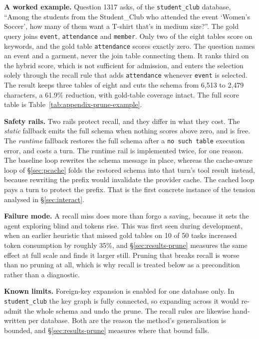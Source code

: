 \documentclass[conference]{IEEEtran}
\begin{document}
\textbf{A worked example.} Question 1317 asks, of the \texttt{student\_club}
database, ``Among the students from the Student\_Club who attended the event
`Women's Soccer', how many of them want a T-shirt that's in medium size?''. The
gold query joins \texttt{event}, \texttt{attendance} and \texttt{member}. Only
two of the eight tables score on keywords, and the gold table
\texttt{attendance} scores exactly zero. The question names an event and a
garment, never the join table connecting them. It ranks third on the hybrid score, which is
not sufficient for admission, and enters the selection solely through the recall
rule that adds \texttt{attendance} whenever \texttt{event} is selected. The
result keeps three tables of eight and cuts the schema from 6{,}513 to 2{,}479
characters, a 61.9\% reduction, with gold-table coverage intact. The full score
table is Table~\ref{tab:appendix-prune-example}.

\textbf{Safety rails.} Two rails protect recall, and they differ in what they
cost. The \emph{static} fallback emits the full schema when nothing scores above
zero, and is free. The \emph{runtime} fallback restores the full schema after a
\texttt{no such table} execution error, and costs a turn. The runtime rail is
implemented twice, for one reason. The baseline loop rewrites the schema
message in place, whereas the cache-aware loop of §\ref{sec:pcache} folds the
restored schema into that turn's tool result instead, because rewriting the
prefix would invalidate the provider cache. The cached loop pays a turn to
protect the prefix. That is the first concrete instance of the tension
analysed in §\ref{sec:interact}.

\textbf{Failure mode.} A recall miss does more than forgo a saving, because it
sets the agent exploring blind and tokens rise. This was first seen during
development, when an earlier heuristic that missed gold tables on 10 of 50 tasks
increased token consumption by roughly 35\%, and §\ref{sec:results-prune} measures
the same effect at full scale and finds it larger still. Pruning that breaks
recall is worse than no pruning at all, which is why recall is treated below as
a precondition rather than a diagnostic.

\textbf{Known limits.} Foreign-key expansion is enabled for one database
only. In \texttt{student\_club} the key graph is fully connected, so expanding
across it would re-admit the whole schema and undo the prune. The recall rules
are likewise hand-written per database. Both are the reason the method's
generalisation is bounded, and §\ref{sec:results-prune} measures where that
bound falls.
\end{document}
